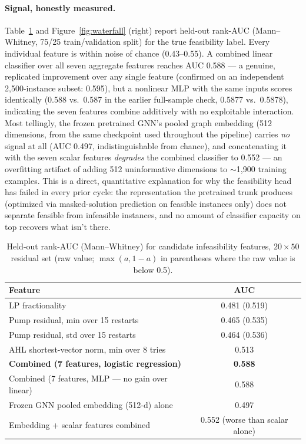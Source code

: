 \documentclass[12pt]{article}
\begin{document}
\paragraph{Signal, honestly measured.} Table~\ref{tab:auc2} and Figure~\ref{fig:waterfall} (right) report held-out rank-AUC (Mann--Whitney, 75/25 train/validation split) for the true feasibility label. Every individual feature is within noise of chance (0.43--0.55). A combined linear classifier over all seven aggregate features reaches AUC 0.588 --- a genuine, replicated improvement over any single feature (confirmed on an independent 2{,}500-instance subset: 0.595), but a nonlinear MLP with the same inputs scores identically (0.588 vs.\ 0.587 in the earlier full-sample check, 0.5877 vs.\ 0.5878), indicating the seven features combine additively with no exploitable interaction. Most tellingly, the frozen pretrained GNN's pooled graph embedding (512 dimensions, from the same checkpoint used throughout the pipeline) carries \emph{no} signal at all (AUC 0.497, indistinguishable from chance), and concatenating it with the seven scalar features \emph{degrades} the combined classifier to 0.552 --- an overfitting artifact of adding 512 uninformative dimensions to $\sim$1{,}900 training examples. This is a direct, quantitative explanation for why the feasibility head has failed in every prior cycle: the representation the pretrained trunk produces (optimized via masked-solution prediction on feasible instances only) does not separate feasible from infeasible instances, and no amount of classifier capacity on top recovers what isn't there.

\begin{table}[t]
\centering
\caption{Held-out rank-AUC (Mann--Whitney) for candidate infeasibility features, $20\times50$ residual set (raw value; $\max(a,1-a)$ in parentheses where the raw value is below 0.5).}
\label{tab:auc2}
\begin{tabular}{lc}
\toprule
Feature & AUC \\
\midrule
LP fractionality & 0.481 (0.519) \\
Pump residual, min over 15 restarts & 0.465 (0.535) \\
Pump residual, std over 15 restarts & 0.464 (0.536) \\
AHL shortest-vector norm, min over 8 tries & 0.513 \\
\textbf{Combined (7 features, logistic regression)} & \textbf{0.588} \\
Combined (7 features, MLP --- no gain over linear) & 0.588 \\
Frozen GNN pooled embedding (512-d) alone & 0.497 \\
Embedding + scalar features combined & 0.552 (worse than scalar alone) \\
\bottomrule
\end{tabular}
\end{table}
\end{document}
